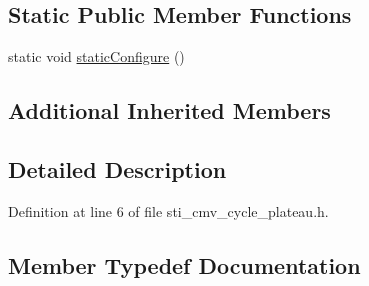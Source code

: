 \subsection*{Static Public Member Functions}
\begin{DoxyCompactItemize}
\item 
static void \hyperlink{structsm__respira__1_1_1cmv__cycle__inner__states_1_1StiPSCyclePlateau_a55007b606d7d8091c80642f240313ef1}{static\+Configure} ()
\end{DoxyCompactItemize}
\subsection*{Additional Inherited Members}


\subsection{Detailed Description}


Definition at line 6 of file sti\+\_\+cmv\+\_\+cycle\+\_\+plateau.\+h.



\subsection{Member Typedef Documentation}
\mbox{\label{structsm__respira__1_1_1cmv__cycle__inner__states_1_1StiPSCyclePlateau_a01fe99a411c05403770fdc1005a9073a}} 
